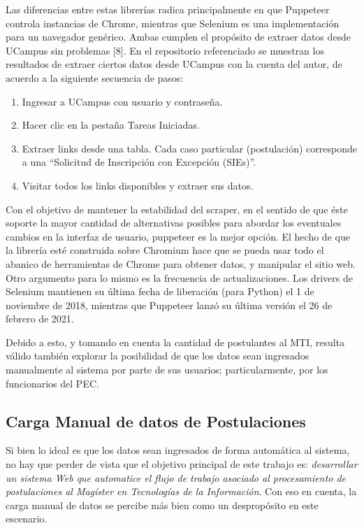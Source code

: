 Las diferencias entre estas librerías radica principalmente en que Puppeteer
controla instancias de Chrome, mientras que Selenium es una implementación para
un navegador genérico. Ambas cumplen el propósito de extraer datos desde UCampus
sin problemas [8]. En el repositorio referenciado se muestran los resultados de
extraer ciertos datos desde UCampus con la cuenta del autor, de acuerdo a la
siguiente secuencia de pasos:

\begin{enumerate}
    \item Ingresar a UCampus con usuario y contraseña.
    \item Hacer clic en la pestaña Tareas Iniciadas.
    \item Extraer links desde una tabla. Cada caso particular (postulación)
    corresponde a una “Solicitud de Inscripción con Excepción (SIEs)”.
    \item Visitar todos los links disponibles y extraer sus datos.
\end{enumerate}

Con el objetivo de mantener la estabilidad del scraper, en el sentido de que
éste soporte la mayor cantidad de alternativas posibles para abordar los
eventuales cambios en la interfaz de usuario, puppeteer es la mejor opción. El
hecho de que la librería esté construida sobre Chromium hace que se pueda usar
todo el abanico de herramientas de Chrome para obtener datos, y manipular el
sitio web. Otro argumento para lo mismo es la frecuencia de actualizaciones. Los
drivers de Selenium mantienen su última fecha de liberación (para Python) el 1
de noviembre de 2018, mientras que Puppeteer lanzó su última versión el 26 de
febrero de 2021.

Debido a esto, y tomando en cuenta la cantidad de postulantes al MTI, resulta
válido también explorar la posibilidad de que los datos sean ingresados
manualmente al sistema por parte de sus usuarios; particularmente, por los
funcionarios del PEC.

\subsection{Carga Manual de datos de Postulaciones}

Si bien lo ideal es que los datos sean ingresados de forma automática al
sistema, no hay que perder de vista que el objetivo principal de este trabajo
es: \emph{desarrollar un sistema Web que automatice el flujo de trabajo asociado
al procesamiento de postulaciones al Magíster en Tecnologías de la Información}.
Con eso en cuenta, la carga manual de datos se percibe más bien como un
despropósito en este escenario.

